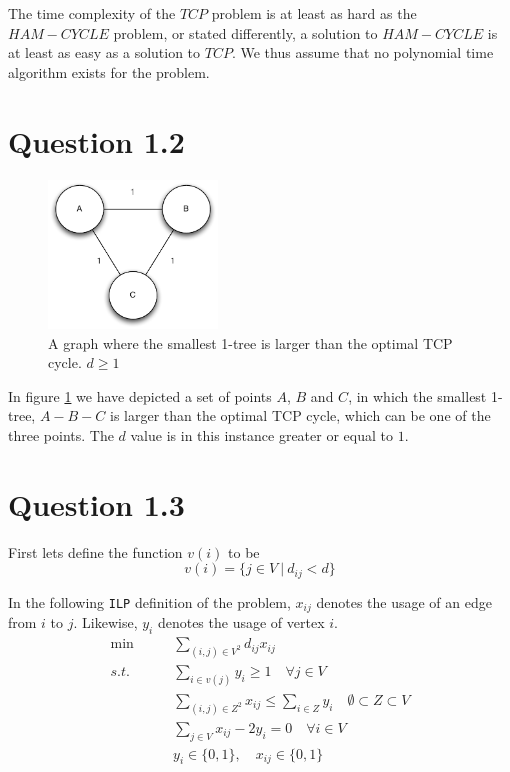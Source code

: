 \documentclass[10pt]{article}
\begin{document}
The time complexity of the $TCP$ problem is at least as hard as the $HAM-CYCLE$ problem, or stated differently, a solution to $HAM-CYCLE$ is at least as easy as a solution to $TCP$. We thus assume that no polynomial time algorithm exists for the problem.


\section*{Question 1.2} %
\label{sec:question_1_2}

\begin{figure}
	\centering
	\includegraphics[width=0.4\textwidth]{figures/unicycle.pdf}
	\caption{A graph where the smallest 1-tree is larger than the optimal TCP cycle. $d \geq 1$}
	\label{unicycle}
\end{figure}
In figure \ref{unicycle} we have depicted a set of points $A$, $B$ and $C$, in which the smallest 1-tree, $A-B-C$ is larger than the optimal TCP cycle, which can be one of the three points.
The $d$ value is in this instance greater or equal to $1$.

\section*{Question 1.3} %
\label{sec:question_1_3}
First lets define the function $v(i)$ to be
\begin{equation}
   v(i) = \{ j \in V\ |\ d_{ij} < d \}
\end{equation}

In the following \texttt{ILP} definition of the problem, $x_{ij}$ denotes the usage of an edge from $i$ to $j$.
Likewise, $y_i$ denotes the usage of vertex $i$.
\begin{align}
\min &\qquad \sum_{(i,j) \in V^2} d_{ij} x_{ij} \\
s.t. &\qquad \sum_{i \in v(j)} y_i \geq 1 \quad \forall j \in V \\
	 &\qquad \sum_{(i,j) \in Z^2} x_{ij} \leq \sum_{i \in Z} y_i \quad \emptyset \subset Z \subset V \label{st1}\\
	 &\qquad \sum_{j \in V } x_{ij} - 2 y_i = 0 \quad \forall i \in V \\
	 &\qquad y_i \in \{0,1\}, \quad x_{ij} \in \{0,1\}  \label{st2}
\end{align}
\end{document}
